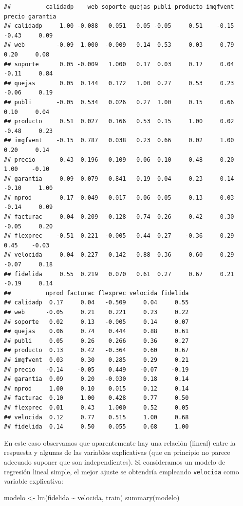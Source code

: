 \documentclass[
  spanish,
]{book}
\newenvironment{Shaded}{\begin{snugshade}}{\end{snugshade}}
\newcommand{\FunctionTok}[1]{\textcolor[rgb]{0.00,0.00,0.00}{#1}}
\newcommand{\NormalTok}[1]{#1}
\newcommand{\OtherTok}[1]{\textcolor[rgb]{0.56,0.35,0.01}{#1}}
\newcommand{\SpecialCharTok}[1]{\textcolor[rgb]{0.00,0.00,0.00}{#1}}
\theoremstyle{break}
\theoremstyle{definition}
\theoremstyle{definition}
\theoremstyle{definition}
\theoremstyle{definition}
\theoremstyle{remark}
\begin{document}
\begin{verbatim}
##          calidadp    web soporte quejas publi producto imgfvent precio garantia
## calidadp     1.00 -0.088   0.051   0.05 -0.05     0.51    -0.15  -0.43     0.09
## web         -0.09  1.000  -0.009   0.14  0.53     0.03     0.79   0.20     0.08
## soporte      0.05 -0.009   1.000   0.17  0.03     0.17     0.04  -0.11     0.84
## quejas       0.05  0.144   0.172   1.00  0.27     0.53     0.23  -0.06     0.19
## publi       -0.05  0.534   0.026   0.27  1.00     0.15     0.66   0.10     0.04
## producto     0.51  0.027   0.166   0.53  0.15     1.00     0.02  -0.48     0.23
## imgfvent    -0.15  0.787   0.038   0.23  0.66     0.02     1.00   0.20     0.14
## precio      -0.43  0.196  -0.109  -0.06  0.10    -0.48     0.20   1.00    -0.10
## garantia     0.09  0.079   0.841   0.19  0.04     0.23     0.14  -0.10     1.00
## nprod        0.17 -0.049   0.017   0.06  0.05     0.13     0.03  -0.14     0.09
## facturac     0.04  0.209   0.128   0.74  0.26     0.42     0.30  -0.05     0.20
## flexprec    -0.51  0.221  -0.005   0.44  0.27    -0.36     0.29   0.45    -0.03
## velocida     0.04  0.227   0.142   0.88  0.36     0.60     0.29  -0.07     0.18
## fidelida     0.55  0.219   0.070   0.61  0.27     0.67     0.21  -0.19     0.14
##          nprod facturac flexprec velocida fidelida
## calidadp  0.17     0.04   -0.509     0.04     0.55
## web      -0.05     0.21    0.221     0.23     0.22
## soporte   0.02     0.13   -0.005     0.14     0.07
## quejas    0.06     0.74    0.444     0.88     0.61
## publi     0.05     0.26    0.266     0.36     0.27
## producto  0.13     0.42   -0.364     0.60     0.67
## imgfvent  0.03     0.30    0.285     0.29     0.21
## precio   -0.14    -0.05    0.449    -0.07    -0.19
## garantia  0.09     0.20   -0.030     0.18     0.14
## nprod     1.00     0.10    0.015     0.12     0.14
## facturac  0.10     1.00    0.428     0.77     0.50
## flexprec  0.01     0.43    1.000     0.52     0.05
## velocida  0.12     0.77    0.515     1.00     0.68
## fidelida  0.14     0.50    0.055     0.68     1.00
\end{verbatim}

En este caso observamos que aparentemente hay una relación (lineal) entre la respuesta y algunas de las variables explicativas (que en principio no parece adecuado suponer que son independientes).
Si consideramos un modelo de regresión lineal simple, el mejor ajuste se obtendría empleando \texttt{velocida} como variable explicativa:

\begin{Shaded}
\begin{Highlighting}[]
\NormalTok{modelo }\OtherTok{\textless{}{-}} \FunctionTok{lm}\NormalTok{(fidelida }\SpecialCharTok{\textasciitilde{}}\NormalTok{ velocida, train)}
\FunctionTok{summary}\NormalTok{(modelo)}
\end{Highlighting}
\end{Shaded}
\end{document}
